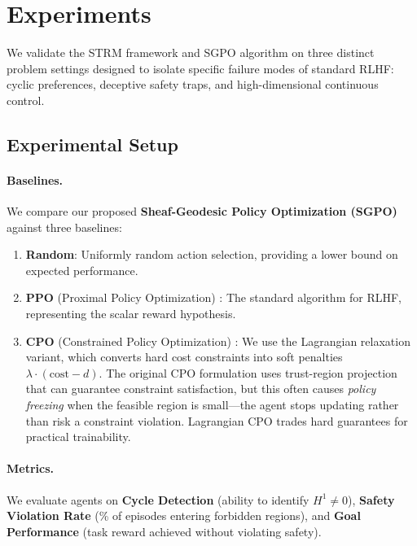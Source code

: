 \section{Experiments}
\label{sec:experiments}

We validate the STRM framework and SGPO algorithm on three distinct problem settings designed to isolate specific failure modes of standard RLHF: cyclic preferences, deceptive safety traps, and high-dimensional continuous control.

\subsection{Experimental Setup}

\paragraph{Baselines.} We compare our proposed \textbf{Sheaf-Geodesic Policy Optimization (SGPO)} against three baselines:
\begin{enumerate}
    \item \textbf{Random}: Uniformly random action selection, providing a lower bound on expected performance.
    \item \textbf{PPO} (Proximal Policy Optimization) \citep{schulman2017proximal}: The standard algorithm for RLHF, representing the scalar reward hypothesis.
    \item \textbf{CPO} (Constrained Policy Optimization) \citep{achiam2017constrained}: We use the Lagrangian relaxation variant, which converts hard cost constraints into soft penalties $\lambda \cdot (\text{cost} - d)$. The original CPO formulation uses trust-region projection that can guarantee constraint satisfaction, but this often causes \emph{policy freezing} when the feasible region is small---the agent stops updating rather than risk a constraint violation. Lagrangian CPO trades hard guarantees for practical trainability.
\end{enumerate}

\paragraph{Metrics.} We evaluate agents on \textbf{Cycle Detection} (ability to identify $H^1 \neq 0$), \textbf{Safety Violation Rate} (\% of episodes entering forbidden regions), and \textbf{Goal Performance} (task reward achieved without violating safety).

